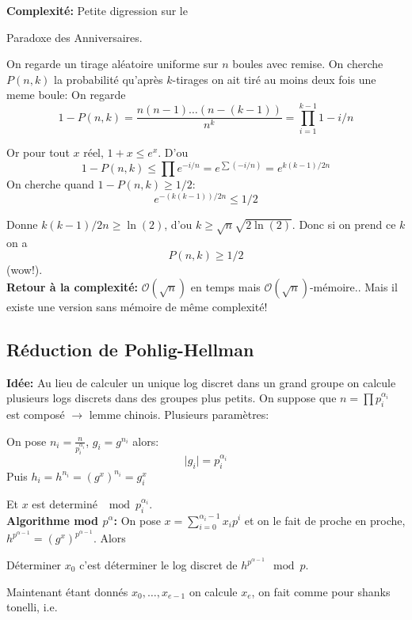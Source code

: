\documentclass[12pt]{article}
\theoremstyle{plain}
\theoremstyle{definition}
\newcommand{\Or}{\mathcal{O}}
\begin{document}
\newpage
\noindent \textbf{Complexité:} Petite digression sur le 
\begin{center}
    Paradoxe des Anniversaires.
\end{center}
On regarde un tirage aléatoire uniforme sur $n$ boules 
avec remise. On cherche $P(n,k)$ la probabilité 
qu'après $k$-tirages on ait tiré au moins deux fois une 
meme boule: On regarde \[1-P(n,k)=\frac{n(n-1)\ldots
(n-(k-1))}{n^k}=\prod_{i=1}^{k-1}{1-i/n} \]

\noindent Or pour tout $x$ réel, $1+x\leq e^x$. D'ou 
    \[1-P(n,k)\leq \prod e^{-i/n}=e^{\sum (-i/n)}
    =e^{k(k-1)/2n}\]
On cherche quand $1-P(n,k)\geq 1/2$:
    \[e^{-(k(k-1))/2n}\leq 1/2\]

\noindent Donne $k(k-1)/2n\geq \ln(2)$, d'ou $k\geq
\sqrt{n}\sqrt{2 \ln(2)}$. Donc si on prend ce $k$ on a 
    \[P(n,k)\geq 1/2\]
(wow!).\\

\noindent \textbf{Retour à la complexité:} $\Or(\sqrt{n})$
en temps mais $\Or(\sqrt{n})$-mémoire..  Mais il existe 
une version sans mémoire de même complexité!

\subsection{Réduction de Pohlig-Hellman}
\textbf{Idée:} Au lieu de calculer un unique log discret 
dans un grand groupe on calcule plusieurs logs discrets 
dans des groupes plus petits. On suppose que $n=\prod p_i
^{\alpha_i}$ est composé $\rightarrow$ lemme chinois.
Plusieurs paramètres:
\begin{center}
    On pose $n_i=\frac{n}{p_i^{\alpha_i}}$, $g_i=g^{n_i}$ alors:
    \[\lvert g_i\rvert = p_i^{\alpha_i}\]
    Puis $h_i=h^{n_i}=(g^x)^{n_i}=g_i^x$
\end{center}

\noindent Et $x$ est determiné $\mod p_i^{\alpha_i}$. \\

\noindent \textbf{Algorithme mod $p^\alpha$:} 
On pose $x=\sum_{i=0}^{\alpha_i-1} x_ip^i$ et on le fait 
de proche en proche, $h^{p^{\alpha-1}}=(g^{x})^{p^{\alpha-1}}$.
Alors\\
\begin{center}
    Déterminer $x_0$ c'est déterminer le log discret 
    de $h^{p^{\alpha-1}}\mod p$.
\end{center}
\noindent Maintenant étant donnés $x_0,\ldots, x_{e-1}$ on calcule 
$x_e$, on fait comme pour shanks tonelli, i.e.
\end{document}
